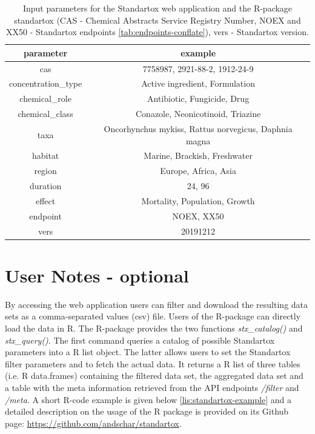 \documentclass[journal,datadescriptor,accept,moreauthors,pdftex]{Definitions/mdpi}
\begin{document}
\begin{table}[H]
    \caption{Input parameters for the Standartox web application and the R-package standartox (CAS - Chemical Abstracts Service Registry Number, NOEX and XX50 - Standartox endpoints \ref{tab:endpoints-conflate}), vers - Standartox version.}
    \label{tab:app-parameters}
    \centering
    \begin{tabular}{cc}
    \toprule
    \textbf{parameter} & \textbf{example} \\ 
    \midrule
    cas & 7758987, 2921-88-2, 1912-24-9 \\
    concentration\_type & Active ingredient, Formulation \\
    chemical\_role & Antibiotic, Fungicide, Drug \\
    chemical\_class & Conazole, Neonicotinoid, Triazine \\
    taxa & Oncorhynchus mykiss, Rattus norvegicus, Daphnia magna \\
    habitat & Marine, Brackish, Freshwater \\
    region & Europe, Africa, Asia \\
    duration & 24, 96 \\
    effect & Mortality, Population, Growth \\
    endpoint & NOEX, XX50 \\
    vers & 20191212 \\
    \bottomrule
\end{tabular}
\end{table}

\section{User Notes - optional}
% 
By accessing the web application users can filter and download the resulting data sets as a comma-separated values (csv) file. Users of the R-package can directly load the data in R. The R-package provides the two functions \textit{stx\_catalog()} and \textit{stx\_query()}. The first command queries a catalog of possible Standartox parameters into a R list object. The latter allows users to set the Standartox filter parameters and to fetch the actual data. It returns a R list of three tables (i.e. R data.frames) containing the filtered data set, the aggregated data set and a table with the meta information retrieved from the API endpoints \textit{/filter} and \textit{/meta}. A short R-code example is given below \ref{lis:standartox-example} and a detailed description on the usage of the R package is provided on its Github page: \url{https://github.com/andschar/standartox}.
\end{document}
